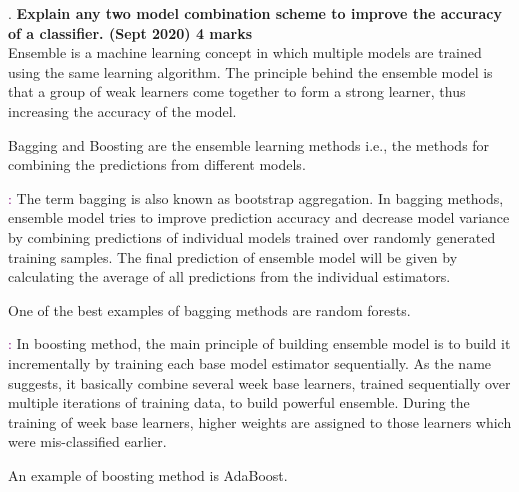 .
\textbf{\textcolor{LightMagenta}{Explain  any  two  model  combination  scheme  to  improve  the  accuracy  of  a classifier. (Sept 2020) \hfill 4 marks}} \\[5pt]
Ensemble is a machine learning concept in which multiple models are trained using the same learning algorithm.
The principle behind the ensemble model is that a group of weak learners come together to form a strong learner, thus increasing the accuracy of the model. 

Bagging and Boosting are the ensemble learning methods i.e., the methods for combining the predictions from different models.

\textcolor{purple}{\underline{}:} 
The term bagging is also known as bootstrap aggregation. In bagging methods, ensemble model tries to improve prediction accuracy and decrease model variance by combining predictions of individual models trained over randomly generated training samples. The final prediction of ensemble model will be given by calculating the average of all predictions from the individual estimators.

One of the best examples of bagging methods are random forests.

\textcolor{purple}{\underline{}:}
In boosting method, the main principle of building ensemble model is to build it incrementally by training each base model estimator sequentially. As the name suggests, it basically combine several week base learners, trained sequentially over multiple iterations of training data, to build powerful ensemble. During the training of week base learners, higher weights are assigned to those learners which were mis-classified earlier.

An example of boosting method is AdaBoost. 